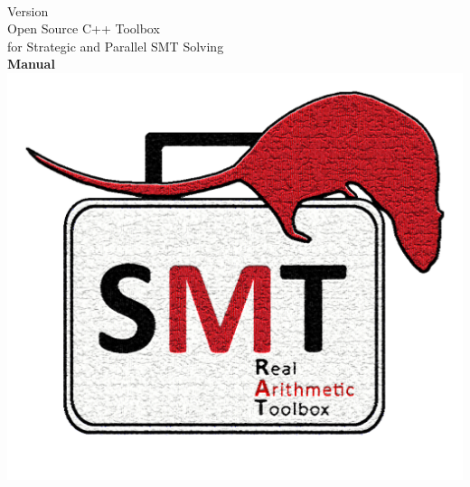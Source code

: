 \begin{titlepage}
	\begin{center}
		\Huge{\textbf{\TITLE}}\\
		\Huge{Version \VERSION}\vspace{1cm}\\
		\Large Open Source C++ Toolbox\\ for Strategic and Parallel SMT Solving\vspace{1cm}\\
		\Huge{\textbf{Manual}}
		\vspace{2cm}\\
		\includegraphics[scale=0.3]{graphics/logo}
	\end{center}
\end{titlepage}
